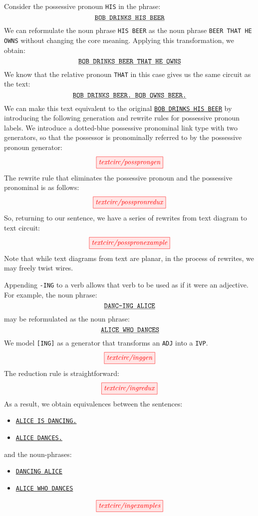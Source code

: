 \begin{example}\label{ex:posspron}
Consider the possessive pronoun \texttt{HIS} in the phrase:
\[
\texttt{\underline{BOB DRINKS HIS BEER}}
\]
We can reformulate the noun phrase \texttt{HIS BEER} as the noun phrase \texttt{BEER THAT HE OWNS} without changing the core meaning. Applying this transformation, we obtain:
\[
\texttt{\underline{BOB DRINKS BEER THAT HE OWNS}}
\]
We know that the relative pronoun \texttt{THAT} in this case gives us the same circuit as the text:
\[
\texttt{\underline{BOB DRINKS BEER. BOB OWNS BEER.}}
\]
We can make this text equivalent to the original \texttt{\underline{BOB DRINKS HIS BEER}} by introducing the following generation and rewrite rules for possessive pronoun labels. We introduce a dotted-blue possessive pronominal link type with two generators, so that the possessor is pronominally referred to by the possessive pronoun generator:
\[
\tikzfig{textcirc/possprongen}
\]
The rewrite rule that eliminates the possessive pronoun and the possessive pronominal is as follows:
\[
\tikzfig{textcirc/posspronredux}
\]
So, returning to our sentence, we have a series of rewrites from text diagram to text circuit: 
\[
\tikzfig{textcirc/posspronexample}
\]
Note that while text diagrams from text are planar, in the process of rewrites, we may freely twist wires.\end{example}

\begin{example}
Appending \texttt{-ING} to a verb allows that verb to be used as if it were an adjective. For example, the noun phrase:
\[
\texttt{\underline{DANC-ING ALICE}}
\]
may be reformulated as the noun phrase: 
\[
\texttt{\underline{ALICE WHO DANCES}}
\]
We model \texttt{[ING]} as a generator that transforms an \texttt{ADJ} into a \texttt{IVP}.
\[
\tikzfig{textcirc/inggen}
\]
The reduction rule is straightforward:
\[
\tikzfig{textcirc/ingredux}
\]
As a result, we obtain equivalences between the sentences:
\begin{itemize}
    \item \texttt{\underline{ALICE IS DANCING.}}
    \item \texttt{\underline{ALICE DANCES.}}
\end{itemize}
and the noun-phrases:
\begin{itemize}
    \item \texttt{\underline{DANCING ALICE}}
    \item \texttt{\underline{ALICE WHO DANCES}}
\end{itemize}
\[
\tikzfig{textcirc/ingexamples}
\]
\end{example}